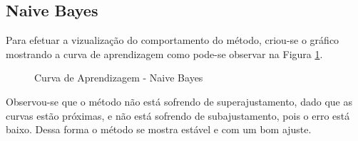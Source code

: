 \subsection{Naive Bayes}
	
Para efetuar a vizualização do comportamento do método, criou-se o gráfico mostrando a curva de aprendizagem como pode-se observar na Figura \ref{fig:NaiveBayes}.

\begin{figure}[h]
	\centering
{}
\caption{Curva de Aprendizagem - Naive Bayes}
\label{fig:NaiveBayes}
\end{figure}

Observou-se que o método não está sofrendo de superajustamento, dado que as curvas estão próximas, e não está sofrendo de subajustamento, pois o erro está baixo. Dessa forma o método se mostra estável e com um bom ajuste.

